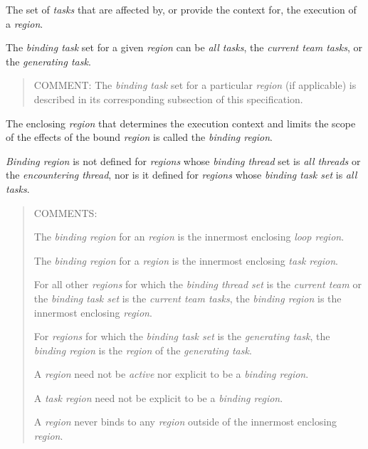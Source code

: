\glossarydefstart
The set of \emph{tasks} that are affected by, or provide the context for, the execution of a 
\emph{region}. 

The \emph{binding task} set for a given \emph{region} can be \emph{all tasks}, 
the \emph{current team tasks}, or the \emph{generating task}. 

\begin{quote}
COMMENT: The \emph{binding task} set for a particular \emph{region} (if applicable) is 
described in its corresponding subsection of this specification.
\end{quote}
\glossarydefend

\pagebreak
{}
\glossarydefstart
The enclosing \emph{region} that determines the execution context and limits the scope of 
the effects of the bound \emph{region} is called the \emph{binding region}.

\emph{Binding region} is not defined for \emph{regions} whose \emph{binding thread} set is \emph{all threads}
or the \emph{encountering thread}, nor is it defined for \emph{regions} whose \emph{binding task set} is 
\emph{all tasks}.

\begin{quote}
COMMENTS: 

The \emph{binding region} for an  \emph{region} is the innermost enclosing 
\emph{loop region}.

The \emph{binding region} for a  \emph{region} is the innermost enclosing 
\emph{task region}.

For all other \emph{regions} for which the \emph{binding thread set} is the \emph{current
team} or the \emph{binding task set} is the \emph{current team tasks}, the \emph{binding 
region} is the innermost enclosing  \emph{region}.

For \emph{regions} for which the \emph{binding task set} is the \emph{generating task}, the 
\emph{binding region} is the \emph{region} of the \emph{generating task}.

A  \emph{region} need not be \emph{active} nor explicit to be a \emph{binding region}.

A \emph{task region} need not be explicit to be a \emph{binding region}.

A \emph{region} never binds to any \emph{region} outside of the innermost enclosing 
 \emph{region}.
\end{quote}
\glossarydefend


